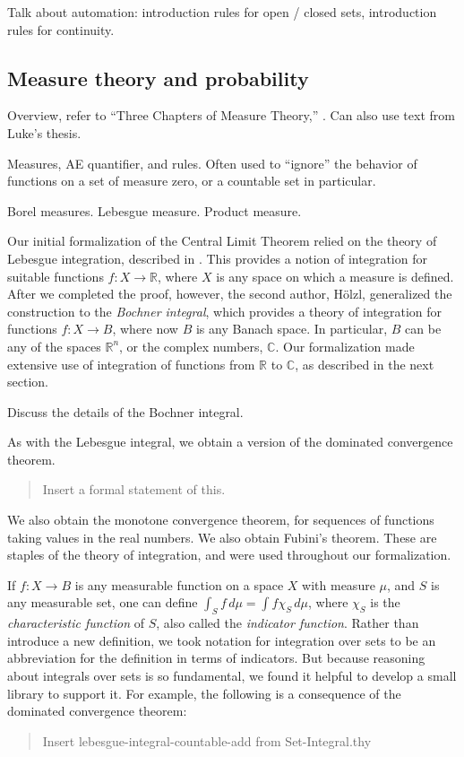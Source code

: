 \documentclass{svjour3}
\newcommand{\todo}[1]{{\color{red}#1}}
\newcommand{\RR}{\mathbb{R}}
\newcommand{\CC}{\mathbb{C}}
\begin{document}
\todo{Talk about automation: introduction rules for open / closed sets, introduction rules for continuity.}

\subsection{Measure theory and probability}

\todo{
Overview, refer to ``Three Chapters of Measure Theory,'' \cite{hoelzl:heller:11}. Can also use text from Luke's thesis.

Measures, AE quantifier, and rules. Often used to ``ignore'' the behavior of functions on a set of measure zero, or a countable set in particular. 

Borel measures. Lebesgue measure. Product measure.}

Our initial formalization of the Central Limit Theorem relied on the theory of Lebesgue integration, described in \cite{hoelzl:heller:11}. This provides a notion of integration for suitable functions $f : X \to \RR$, where $X$ is any space on which a measure is defined. After we completed the proof, however, the second author, H\"olzl, generalized the construction to the \emph{Bochner integral}, which provides a theory of integration for functions $f : X \to B$, where now $B$ is any Banach space. In particular, $B$ can be any of the spaces $\RR^n$, or the complex numbers, $\CC$. Our formalization made extensive use of integration of functions from $\RR$ to $\CC$, as described in the next section.

\todo{Discuss the details of the Bochner integral.}

As with the Lebesgue integral, we obtain a version of the dominated convergence theorem.
\begin{quote}
 \todo{Insert a formal statement of this.}
\end{quote}
We also obtain the monotone convergence theorem, for sequences of functions taking values in the real numbers. We also obtain Fubini's theorem. These are staples of the theory of integration, and were used throughout our formalization.

If $f : X \to B$ is any measurable function on a space $X$ with measure $\mu$, and $S$ is any measurable set, one can define $\int_S f \, d\mu = \int f \chi_S \, d\mu$, where $\chi_S$ is the \emph{characteristic function} of $S$, also called the \emph{indicator function}. Rather than introduce a new definition, we took notation for integration over sets to be an abbreviation for the definition in terms of indicators. But because reasoning about integrals over sets is so fundamental, we found it helpful to develop a small library to support it. For example, the following is a consequence of the dominated convergence theorem:
\begin{quote}
\todo{Insert lebesgue-integral-countable-add from Set-Integral.thy}
\end{quote}
\end{document}
